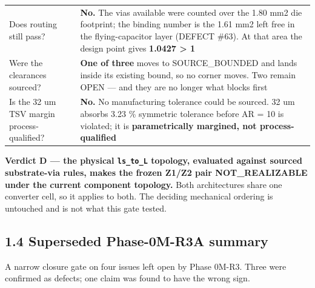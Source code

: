 \documentclass[10pt,]{article}
\begin{document}
\begin{longtable}[]{@{}ll@{}}
\begin{minipage}[t]{0.47\columnwidth}\raggedright
Does routing still pass?\strut
\end{minipage} & \begin{minipage}[t]{0.47\columnwidth}\raggedright
\textbf{No.} The vias available were counted over the 1.80 mm2 die
footprint; the binding number is the 1.61 mm2 left free in the
flying-capacitor layer (DEFECT \#63). At that area the design point
gives \textbf{1.0427 \textgreater{} 1}\strut
\end{minipage}\tabularnewline
\begin{minipage}[t]{0.47\columnwidth}\raggedright
Were the clearances sourced?\strut
\end{minipage} & \begin{minipage}[t]{0.47\columnwidth}\raggedright
\textbf{One of three} moves to SOURCE\_BOUNDED and lands inside its
existing bound, so no corner moves. Two remain OPEN --- and they are no
longer what blocks first\strut
\end{minipage}\tabularnewline
\begin{minipage}[t]{0.47\columnwidth}\raggedright
Is the 32 um TSV margin process-qualified?\strut
\end{minipage} & \begin{minipage}[t]{0.47\columnwidth}\raggedright
\textbf{No.} No manufacturing tolerance could be sourced. 32 um absorbs
3.23 \% symmetric tolerance before AR = 10 is violated; it is
\textbf{parametrically margined, not process-qualified}\strut
\end{minipage}\tabularnewline
\bottomrule
\end{longtable}

\textbf{Verdict D --- the physical \texttt{ls\_to\_L} topology,
evaluated against sourced substrate-via rules, makes the frozen Z1/Z2
pair NOT\_REALIZABLE under the current component topology.} Both
architectures share one converter cell, so it applies to both. The
deciding mechanical ordering is untouched and is not what this gate
tested.

\newpage

\hypertarget{superseded-phase-0m-r3a-summary}{%
\subsection{1.4 Superseded Phase-0M-R3A
summary}\label{superseded-phase-0m-r3a-summary}}

A narrow closure gate on four issues left open by Phase 0M-R3. Three
were confirmed as defects; one claim was found to have the wrong sign.
\end{document}

